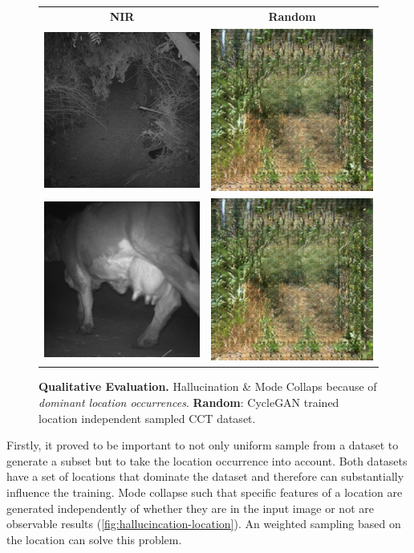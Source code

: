\documentclass[a4paper,11pt, DIV=12]{scrartcl}
\begin{document}
\begin{figure}[h]
   \centering
   \begin{tabular}[width=.1\textwidth]{c c}
      \textbf{NIR} \cite{caltech}                                                             & \textbf{Random} \\
      \includegraphics[width=.2\textwidth]{img/5858c26e-23d2-11e8-a6a3-ec086b02610b_real.png} &
      \includegraphics[width=.2\textwidth]{img/5858c26e-23d2-11e8-a6a3-ec086b02610b_hal.png}                    \\

      \includegraphics[width=.2\textwidth]{img/586936d3-23d2-11e8-a6a3-ec086b02610b_real.png} &
      \includegraphics[width=.2\textwidth]{img/586936d3-23d2-11e8-a6a3-ec086b02610b_hal.png}
   \end{tabular}
   \caption{
      \textbf{Qualitative Evaluation.} Hallucination \& Mode Collaps because of \textit{dominant location occurrences}.
      \textbf{Random}: CycleGAN trained location independent sampled CCT dataset.
   }
   \label{fig:hallucincation-location}
\end{figure}

Firstly, it proved to be important to not only uniform sample from a dataset to generate a subset but to take the location occurrence into account.
Both datasets have a set of locations that dominate the dataset and therefore can substantially influence the training.
Mode collapse such that specific features of a location are generated independently of whether they are in the input image or not are
observable results (\autoref{fig:hallucincation-location}). An weighted sampling based on the location can solve this problem.
\end{document}
